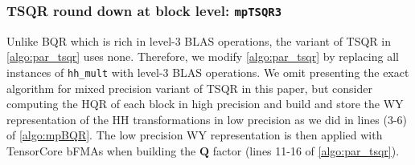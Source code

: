 \documentclass[review,onefignum,onetabnum]{siamart190516}
\newcommand{\bb}[1]{\mathbf{#1}}
\begin{document}
\subsubsection{TSQR round down at block level: {\tt mpTSQR3}}\label{sec:mp-3t}
%
Unlike BQR which is rich in level-3 BLAS operations, the variant of TSQR in \cref{algo:par_tsqr} uses none.
Therefore, we modify \cref{algo:par_tsqr} by replacing all instances of {\tt hh\_mult} with level-3 BLAS operations.
We omit presenting the exact algorithm for mixed precision variant of TSQR in this paper, but consider computing the HQR of each block in high precision and build and store the WY representation of the HH transformations in low precision as we did in lines (3-6) of \cref{algo:mpBQR}.
The low precision WY representation is then applied with TensorCore bFMAs when building the $\bb{Q}$ factor (lines 11-16 of \cref{algo:par_tsqr}). 
\end{document}
